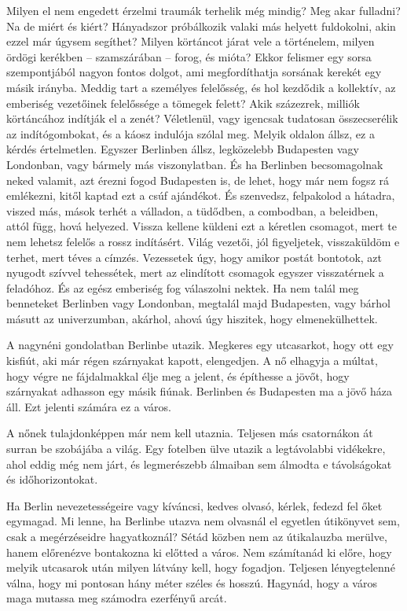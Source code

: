 \bigskip
\begin{itshape}
Milyen el nem engedett érzelmi traumák terhelik még mindig? Meg
akar fulladni? Na de miért és kiért? Hányadszor próbálkozik valaki más
helyett fuldokolni, akin ezzel már úgysem segíthet? Milyen körtáncot járat
vele a történelem, milyen ördögi kerékben -- szamszárában -- forog, és
mióta? Ekkor felismer egy sorsa szempontjából nagyon fontos dolgot, ami
megfordíthatja sorsának kerekét egy másik irányba. Meddig tart a személyes
felelősség, és hol kezdődik a kollektív, az emberiség vezetőinek felelőssége a
tömegek felett? Akik százezrek, milliók körtáncához indítják el a zenét?
Véletlenül, vagy igencsak tudatosan összecserélik az indítógombokat, és a
káosz indulója szólal meg. Melyik oldalon állsz, ez a kérdés értelmetlen.
Egyszer Berlinben állsz, legközelebb Budapesten vagy Londonban, vagy
bármely más viszonylatban. És ha Berlinben becsomagolnak neked valamit,
azt érezni fogod Budapesten is, de lehet, hogy már nem fogsz rá
emlékezni, kitől kaptad ezt a csúf ajándékot. És szenvedsz, felpakolod a
hátadra, viszed más, mások terhét a válladon, a tüdődben, a combodban,
a beleidben, attól függ, hová helyezed. Vissza kellene küldeni ezt a kéretlen
csomagot, mert te nem lehetsz felelős a rossz indításért. Világ vezetői, jól
figyeljetek, visszaküldöm e terhet, mert téves a címzés. Vezessetek úgy, hogy
amikor postát bontotok, azt nyugodt szívvel tehessétek, mert az elindított
csomagok egyszer visszatérnek a feladóhoz. És az egész emberiség fog
válaszolni nektek. Ha nem talál meg benneteket Berlinben vagy Londonban,
megtalál majd Budapesten, vagy bárhol másutt az univerzumban, akárhol,
ahová úgy hiszitek, hogy elmenekülhettek.
\end{itshape}
\bigskip

A nagynéni gondolatban Berlinbe utazik. Megkeres egy utcasarkot,
hogy ott egy kisfiút, aki már régen szárnyakat kapott, elengedjen. A nő
elhagyja a múltat, hogy végre ne fájdalmakkal élje meg a jelent, és
építhesse a jövőt, hogy szárnyakat adhasson egy másik fiúnak. Berlinben
és Budapesten ma a jövő háza áll. Ezt jelenti számára ez a város.

A nőnek tulajdonképpen már nem kell utaznia. Teljesen más csatornákon
át surran be szobájába a világ. Egy fotelben ülve utazik a legtávolabbi
vidékekre, ahol eddig még nem járt, és legmerészebb álmaiban
sem álmodta e távolságokat és időhorizontokat.

Ha Berlin nevezetességeire vagy kíváncsi, kedves olvasó, kérlek, fedezd
fel őket egymagad. Mi lenne, ha Berlinbe utazva nem olvasnál el
egyetlen útikönyvet sem, csak a megérzéseidre hagyatkoznál? Sétád
közben nem az útikalauzba merülve, hanem előrenézve bontakozna ki
előtted a város. Nem számítanád ki előre, hogy melyik utcasarok után
milyen látvány kell, hogy fogadjon. Teljesen lényegtelenné válna, hogy
mi pontosan hány méter széles és hosszú. Hagynád, hogy a város maga
mutassa meg számodra ezerfényű arcát.

